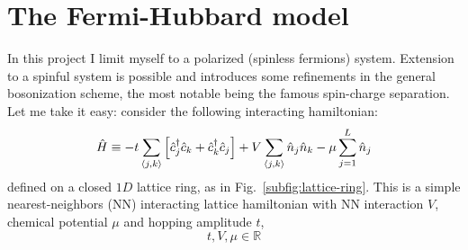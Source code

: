 \clearpage
\section{The Fermi-Hubbard model}

In this project I limit myself to a polarized (spinless fermions) system. Extension to a spinful system is possible and introduces some refinements in the general bosonization scheme, the most notable being the famous spin-charge separation. Let me take it easy: consider the following interacting hamiltonian:
\begin{equation}\label{eq:spinless-hamiltonian-pbc}
	\hat H \equiv -t \sum_{\ev{j,k}} \left[
		\hat c_j^\dagger \hat c_k + \hat c_k^\dagger \hat c_j 
	\right] + V \sum_{\ev{j,k}} \hat n_j \hat n_k - \mu \sum_{j=1}^L \hat n_j
\end{equation}
defined on a closed $1D$ lattice ring, as in Fig.~\ref{subfig:lattice-ring}.
This is a simple nearest-neighbors (NN) interacting lattice hamiltonian with NN interaction $V$, chemical potential $\mu$ and hopping amplitude $t$,
\[
	t, V, \mu \in \mathbb{R}
\]

